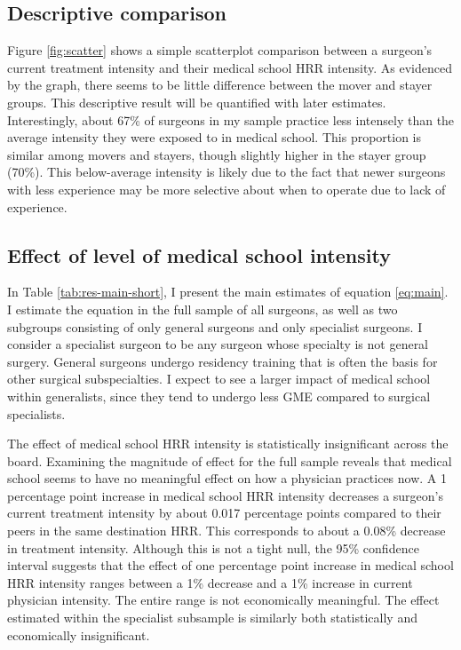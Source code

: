 
\subsection{Descriptive comparison}
Figure \ref{fig:scatter} shows a simple scatterplot comparison between a surgeon's current treatment intensity and their medical school HRR intensity. As evidenced by the graph, there seems to be little difference between the mover and stayer groups. This descriptive result will be quantified with later estimates. Interestingly, about 67\% of surgeons in my sample practice less intensely than the average intensity they were exposed to in medical school. This proportion is similar among movers and stayers, though slightly higher in the stayer group (70\%). This below-average intensity is likely due to the fact that newer surgeons with less experience may be more selective about when to operate due to lack of experience. 



\subsection{Effect of level of medical school intensity}
In Table \ref{tab:res-main-short}, I present the main estimates of equation \ref{eq:main}. I estimate the equation in the full sample of all surgeons, as well as two subgroups consisting of only general surgeons and only specialist surgeons. I consider a specialist surgeon to be any surgeon whose specialty is not general surgery. General surgeons undergo residency training that is often the basis for other surgical subspecialties. I expect to see a larger impact of medical school within generalists, since they tend to undergo less GME compared to surgical specialists. 



The effect of medical school HRR intensity is statistically insignificant across the board. Examining the magnitude of effect for the full sample reveals that medical school seems to have no meaningful effect on how a physician practices now. A 1 percentage point increase in medical school HRR intensity decreases a surgeon's current treatment intensity by about 0.017 percentage points compared to their peers in the same destination HRR. This corresponds to about a 0.08\% decrease in treatment intensity. Although this is not a tight null, the 95\% confidence interval suggests that the effect of one percentage point increase in medical school HRR intensity ranges between a 1\% decrease and a 1\% increase in current physician intensity. The entire range is not economically meaningful. The effect estimated within the specialist subsample is similarly both statistically and economically insignificant. 

